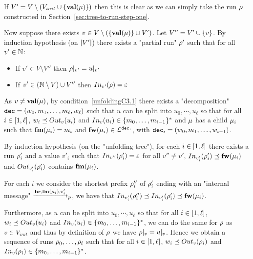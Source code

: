 If $V' = V \setminus (V_{init} \cup \set{\valuelabel{\node}})$ then this is clear as we can simply take the run $\run$ constructed in Section~\ref{sec:tree-to-run-step-one}.

Now suppose there exists $v \in V \setminus (\set{\valuelabel{\node}} \cup V')$. Let $V'' = V' \cup \set{v}$. By induction hypothesis (on $\size{V'}$) there exists a "partial run" $\run'$ such that for all $v' \in \nats$:
\begin{itemize}
	\item If $v' \in V \setminus V''$ then $\vproj{v'}{\run} = \vproj{v'}{u}$
	
	\item If $v' \in (\nats \setminus V) \cup V''$ then $\vinput{v'}{\run} = \epsilon$
\end{itemize}

As $v \neq \valuelabel{\node}$, by condition~\ref{unfoldingC3.1} there exists a "decomposition" $\decsymb = (w_0, m_1, \ldots, m_\ell, w_\ell)$ such that $u$ can be split into $u_0, \cdots, u_\ell$ so that for all $i \in \nset{1}{\ell}$, $w_i \subword \voutput{v}{u_i}$ and $\vinput{v}{u_i} \in \set{m_0, \ldots, m_{i-1}}^*$ and $\node$ has a child $\node_i$ such that $\followlabelmessage{\mu_i} = m_i$ and $\followlabelword{\node_i} \in \langdec{\decsymb_i}$, with $\decsymb_i = (w_0, m_1, \ldots, w_{i-1})$.

By induction hypothesis (on the "unfolding tree"), for each $i \in\nset{1}{\ell}$ there exists a run $\run'_i$ and a value $v'_i$ such that $\vinput{v''}{\run'_i} = \epsilon$ for all $v'' \neq v'$, $\vinput{v'_i}{\run'_i} \subword \followlabelword{\node_i}$ and $\voutput{v'_i}{\run'_i}$ contains $\followlabelmessage{\node_i}$. 

For each $i$ we consider the shortest prefix $\run''_i$ of $\run'_i$ ending with an "internal message" $\intmessage{\followlabelmessage{\node_i}}{v'_i}$, we have that $\vinput{v'_i}{\run''_i} \subword \vinput{v'_i}{\run'_i} \subword \followlabelword{\node_i}$.

Furthermore, as $u$ can be split into $u_0, \cdots, u_\ell$ so that for all $i \in \nset{1}{\ell}$, $w_i \subword \voutput{v}{u_i}$ and $\vinput{v}{u_i} \in \set{m_0, \ldots, m_{i-1}}^*$, we can do the same for $\run$ as $v \in V_{init}$ and thus by definition of $\run$ we have $\vproj{v}{\run} = \vproj{v}{u}$.
Hence we obtain a sequence of runs $\run_0, \ldots, \run_\ell$ such that for all $i \in \nset{1}{\ell}$, $w_i \subword \voutput{v}{\run_i}$ and $\vinput{v}{\run_i} \in \set{m_0, \ldots, m_{i-1}}^*$.

